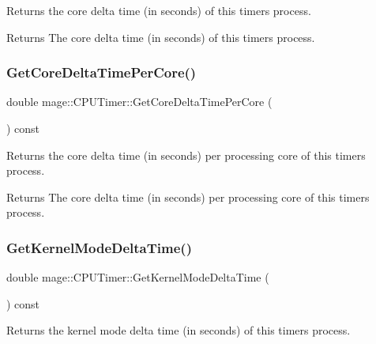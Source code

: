 Returns the core delta time (in seconds) of this timer\textquotesingle{}s process.

\begin{DoxyReturn}{Returns}
The core delta time (in seconds) of this timer\textquotesingle{}s process. 
\end{DoxyReturn}
\hypertarget{classmage_1_1_c_p_u_timer_af7027d8e6d4c63fd75c207357b3ff2c1}{}\label{classmage_1_1_c_p_u_timer_af7027d8e6d4c63fd75c207357b3ff2c1} 
\subsubsection{\texorpdfstring{Get\+Core\+Delta\+Time\+Per\+Core()}{GetCoreDeltaTimePerCore()}}
{\footnotesize\ttfamily double mage\+::\+C\+P\+U\+Timer\+::\+Get\+Core\+Delta\+Time\+Per\+Core (\begin{DoxyParamCaption}{ }\end{DoxyParamCaption}) const}

Returns the core delta time (in seconds) per processing core of this timer\textquotesingle{}s process.

\begin{DoxyReturn}{Returns}
The core delta time (in seconds) per processing core of this timer\textquotesingle{}s process. 
\end{DoxyReturn}
\hypertarget{classmage_1_1_c_p_u_timer_a6bb5464996283d8ff2161cc683e8c0d1}{}\label{classmage_1_1_c_p_u_timer_a6bb5464996283d8ff2161cc683e8c0d1} 
\subsubsection{\texorpdfstring{Get\+Kernel\+Mode\+Delta\+Time()}{GetKernelModeDeltaTime()}}
{\footnotesize\ttfamily double mage\+::\+C\+P\+U\+Timer\+::\+Get\+Kernel\+Mode\+Delta\+Time (\begin{DoxyParamCaption}{ }\end{DoxyParamCaption}) const}

Returns the kernel mode delta time (in seconds) of this timer\textquotesingle{}s process.

